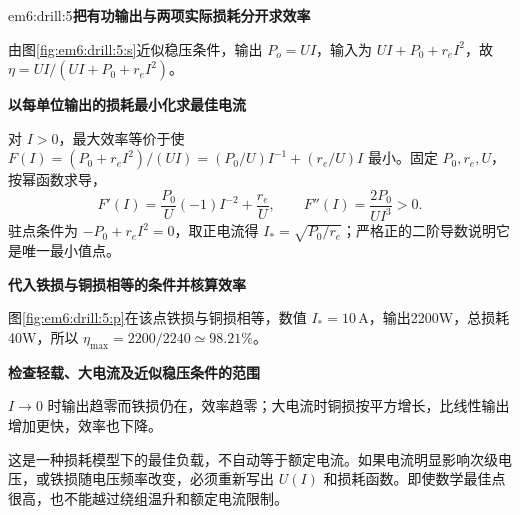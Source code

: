 \begin{drillsolution}{em6:drill:5}\textbf{把有功输出与两项实际损耗分开求效率}\par\nobreak
由图\ref{fig:em6:drill:5:s}近似稳压条件，输出 $P_o=UI$，输入为 $UI+P_0+r_eI^2$，故 $\eta=UI/(UI+P_0+r_eI^2)$。

\par\medskip{}\noindent\textbf{以每单位输出的损耗最小化求最佳电流}\par\nobreak
对 $I>0$，最大效率等价于使 $F(I)=(P_0+r_eI^2)/(UI)=(P_0/U)I^{-1}+(r_e/U)I$ 最小。固定 $P_0,r_e,U$，按幂函数求导，
\[
 F'(I)=\frac{P_0}{U}(-1)I^{-2}+\frac{r_e}{U},\qquad
 F''(I)=\frac{2P_0}{UI^3}>0.
\]
驻点条件为 $-P_0+r_eI^2=0$，取正电流得 $I_*=\sqrt{P_0/r_e}$；严格正的二阶导数说明它是唯一最小值点。



\par\medskip{}\noindent\textbf{代入铁损与铜损相等的条件并核算效率}\par\nobreak
图\ref{fig:em6:drill:5:p}在该点铁损与铜损相等，数值 $I_*=10\,\mathrm A$，输出2200W，总损耗40W，所以 $\eta_{\max}=2200/2240\simeq98.21\%$。

\par\medskip{}\noindent\textbf{检查轻载、大电流及近似稳压条件的范围}\par\nobreak
$I\to0$ 时输出趋零而铁损仍在，效率趋零；大电流时铜损按平方增长，比线性输出增加更快，效率也下降。

这是一种损耗模型下的最佳负载，不自动等于额定电流。如果电流明显影响次级电压，或铁损随电压频率改变，必须重新写出 $U(I)$ 和损耗函数。即使数学最佳点很高，也不能越过绕组温升和额定电流限制。\end{drillsolution}
